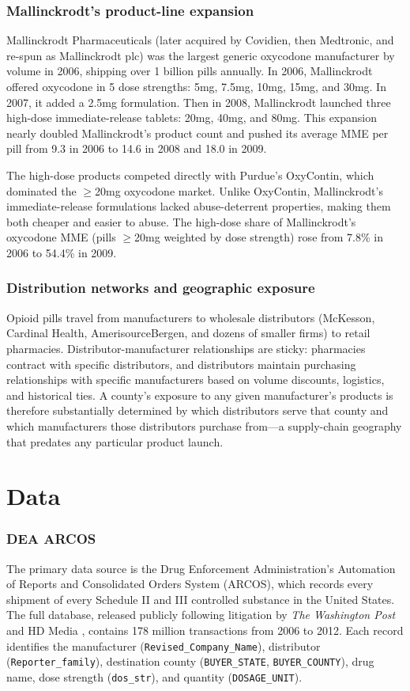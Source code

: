 \documentclass[12pt]{article}
\begin{document}
\subsubsection*{Mallinckrodt's product-line expansion} Mallinckrodt Pharmaceuticals (later acquired by Covidien, then Medtronic, and re-spun as Mallinckrodt plc) was the largest generic oxycodone manufacturer by volume in 2006, shipping over 1 billion pills annually. In 2006, Mallinckrodt offered oxycodone in 5 dose strengths: 5mg, 7.5mg, 10mg, 15mg, and 30mg. In 2007, it added a 2.5mg formulation. Then in 2008, Mallinckrodt launched three high-dose immediate-release tablets: 20mg, 40mg, and 80mg. This expansion nearly doubled Mallinckrodt's product count and pushed its average MME per pill from 9.3 in 2006 to 14.6 in 2008 and 18.0 in 2009.

The high-dose products competed directly with Purdue's OxyContin, which dominated the $\geq$20mg oxycodone market. Unlike OxyContin, Mallinckrodt's immediate-release formulations lacked abuse-deterrent properties, making them both cheaper and easier to abuse. The high-dose share of Mallinckrodt's oxycodone MME (pills $\geq$20mg weighted by dose strength) rose from 7.8\% in 2006 to 54.4\% in 2009.

\subsubsection*{Distribution networks and geographic exposure} Opioid pills travel from manufacturers to wholesale distributors (McKesson, Cardinal Health, AmerisourceBergen, and dozens of smaller firms) to retail pharmacies. Distributor-manufacturer relationships are sticky: pharmacies contract with specific distributors, and distributors maintain purchasing relationships with specific manufacturers based on volume discounts, logistics, and historical ties. A county's exposure to any given manufacturer's products is therefore substantially determined by which distributors serve that county and which manufacturers those distributors purchase from---a supply-chain geography that predates any particular product launch.


\section{Data}
\label{sec:data}

\subsubsection*{DEA ARCOS} The primary data source is the Drug Enforcement Administration's Automation of Reports and Consolidated Orders System (ARCOS), which records every shipment of every Schedule II and III controlled substance in the United States. The full database, released publicly following litigation by \emph{The Washington Post} and HD Media \citep{higham2019arcos}, contains 178 million transactions from 2006 to 2012. Each record identifies the manufacturer (\texttt{Revised\_Company\_Name}), distributor (\texttt{Reporter\_family}), destination county (\texttt{BUYER\_STATE}, \texttt{BUYER\_COUNTY}), drug name, dose strength (\texttt{dos\_str}), and quantity (\texttt{DOSAGE\_UNIT}).
\end{document}
